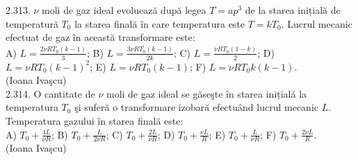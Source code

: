2.313. $\nu$ moli de gaz ideal evoluează după legea $T=a p^{3}$ de la starea inițială de temperatură $T_{0}$ la starea finală în care temperatura este $T=k T_{0}$. Lucrul mecanic efectuat de gaz în această transformare este:\\ A) $L=\frac{2 \nu R T_{0}(k-1)}{3}$; B) $L=\frac{3 \nu R T_{0}^{\prime}(k-1)}{2 k}$; C) $L=\frac{\nu R T_{0}(1-k)}{2}$; D) $L=\nu R T_{0}(k-1)^{2}$; E) $L=\nu R T_{0}(k-1)$; F) $L=\nu R T_{0} k(k-1)$.\\ (Ioana Ivaşcu)\\

2.314. O cantitate de $\nu$ moli de gaz ideal se găseşte în starea inițială la temperatura $T_{0}$ şi suferă o transformare izobară efectuând lucrul mecanic $L$. Temperatura gazului în starea finală este:\\ A) $T_{0}+\frac{4 L}{\nu R}$; B) $T_{0}+\frac{L}{2 \nu R}$; C) $T_{0}+\frac{2 L}{\nu R}$; D) $T_{0}+\frac{\nu L}{R}$; E) $T_{0}+\frac{L}{\nu R}$; F) $T_{0}+\frac{2 \nu L}{R}$.\\ (Ioana Ivaşcu)\\

